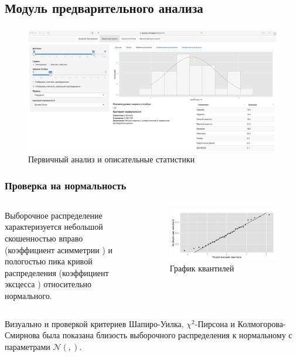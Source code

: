 \documentclass[notheorems]{beamer}
\theoremstyle{definition}
\theoremstyle{example}
\theoremstyle{plain}
\newcommand{\inp}[1]{}
\newcommand{\descriptive}[2]{\inp{#1/descriptive/#2}}
\newcommand{\normaldistr}{$\mathcal{N}(\descriptive{original}{mean}, \descriptive{original}{variance})$}
\begin{document}
\subsection{Модуль предварительного анализа}

\begin{frame}
  \frametitle{\large\secname}
  \framesubtitle{\subsecname}
    \begin{figure}[h]
    \includegraphics[width=1\textwidth]{../../figures/static/1_basis.png}
    \caption{Первичный анализ и описательные статистики}
  \end{figure}
\end{frame}

\begin{frame}
  \frametitle{Проверка на нормальность}
  \begin{columns}[c]
  {\footnotesize
  Выборочное распределение характеризуется небольшой скошенностью вправо (коэффициент асимметрии $ \descriptive{original}{skew} $) и пологостью пика кривой распределения (коэффициент эксцесса $ \descriptive{original}{kurtosis} $) относительно нормального.
  }

  \begin{figure}[h]
    \includegraphics[width=1\linewidth]{../../figures/original/quantile.png}
    \caption{График квантилей}
  \end{figure}
  \end{columns}
  
  \vspace{1em}
  
  Визуально и проверкой критериев Шапиро-Уилка, $\chi^2$-Пирсона и Колмогорова-Смирнова была показана близость выборочного распределения к нормальному с параметрами \normaldistr.
\end{frame}
\end{document}
